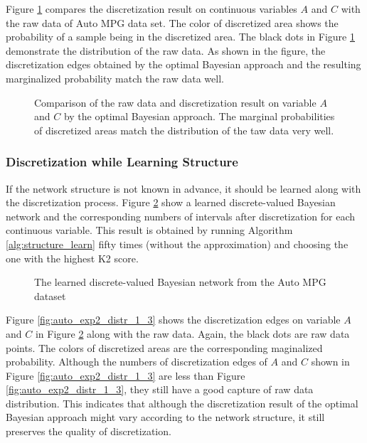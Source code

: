 Figure \ref{fig:auto_exp1_distr_1_3} compares the discretization result on continuous variables $A$ and $C$ with the raw data of Auto MPG data set. The color of discretized area shows the probability of a sample being in the discretized area. The black dots in Figure \ref{fig:auto_exp1_distr_1_3} demonstrate the distribution of the raw data. As shown in the figure, the discretization edges obtained by the optimal Bayesian approach and the resulting marginalized probability match the raw data well.

\begin{figure}[ht]
\centering
      
  \caption{Comparison of the raw data and discretization result on variable $A$ and $C$ by the optimal Bayesian approach. The marginal probabilities of discretized areas match the distribution of the taw data very well.}
  \label{fig:auto_exp1_distr_1_3}
\end{figure}

\subsubsection{Discretization while Learning Structure}
\label{subsubsec:auto_exp2}

If the network structure is not known in advance, it should be learned along with the discretization process. Figure \ref{fig:auto_graph_2} show a learned discrete-valued Bayesian network and the corresponding numbers of intervals after discretization for each continuous variable. This result is obtained by running Algorithm \ref{alg:structure_learn} fifty times (without the approximation) and choosing the one with the highest K2 score.


\begin{figure}[ht]
\centering
      
  \caption{The learned discrete-valued Bayesian network from the Auto MPG dataset}
  \label{fig:auto_graph_2}
\end{figure}


Figure \ref{fig:auto_exp2_distr_1_3} shows the discretization edges on variable $A$ and $C$ in Figure \ref{fig:auto_graph_2} along with the raw data. Again, the black dots are raw data points. The colors of discretized areas are the corresponding maginalized probability. Although the numbers of discretization edges of $A$ and $C$ shown in Figure \ref{fig:auto_exp2_distr_1_3} are less than Figure \ref{fig:auto_exp2_distr_1_3}, they still have a good capture of raw data distribution. This indicates that although the discretization result of the optimal Bayesian approach might vary according to the network structure, it still preserves the quality of discretization.

